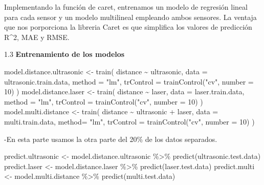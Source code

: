 \documentclass[
]{article}
\newenvironment{Shaded}{\begin{snugshade}}{\end{snugshade}}
\newcommand{\AttributeTok}[1]{\textcolor[rgb]{0.77,0.63,0.00}{#1}}
\newcommand{\DecValTok}[1]{\textcolor[rgb]{0.00,0.00,0.81}{#1}}
\newcommand{\FunctionTok}[1]{\textcolor[rgb]{0.00,0.00,0.00}{#1}}
\newcommand{\NormalTok}[1]{#1}
\newcommand{\OtherTok}[1]{\textcolor[rgb]{0.56,0.35,0.01}{#1}}
\newcommand{\SpecialCharTok}[1]{\textcolor[rgb]{0.00,0.00,0.00}{#1}}
\newcommand{\StringTok}[1]{\textcolor[rgb]{0.31,0.60,0.02}{#1}}
\begin{document}
Implementando la función de caret, entrenamos un modelo de regresión
lineal para cada sensor y un modelo multilineal empleando ambos
sensores. La ventaja que nos porporciona la libreria Caret es que
simplifica los valores de predicción R\^{}2, MAE y RMSE.

1.3 \textbf{Entrenamiento de los modelos}

\begin{Shaded}
\begin{Highlighting}[]
\NormalTok{model.distance.ultrasonic }\OtherTok{\textless{}{-}} \FunctionTok{train}\NormalTok{(}
\NormalTok{        distance }\SpecialCharTok{\textasciitilde{}}\NormalTok{ ultrasonic,}
        \AttributeTok{data =}\NormalTok{ ultrasonic.train.data,}
        \AttributeTok{method =} \StringTok{"lm"}\NormalTok{,}
        \AttributeTok{trControl =} \FunctionTok{trainControl}\NormalTok{(}\StringTok{"cv"}\NormalTok{, }\AttributeTok{number =} \DecValTok{10}\NormalTok{)}
\NormalTok{        )}
\NormalTok{model.distance.laser }\OtherTok{\textless{}{-}} \FunctionTok{train}\NormalTok{(}
\NormalTok{        distance }\SpecialCharTok{\textasciitilde{}}\NormalTok{ laser,}
        \AttributeTok{data =}\NormalTok{ laser.train.data,}
        \AttributeTok{method =} \StringTok{"lm"}\NormalTok{,}
        \AttributeTok{trControl =} \FunctionTok{trainControl}\NormalTok{(}\StringTok{"cv"}\NormalTok{, }\AttributeTok{number =} \DecValTok{10}\NormalTok{)}
\NormalTok{    )}
\NormalTok{model.multi.distance }\OtherTok{\textless{}{-}} \FunctionTok{train}\NormalTok{(}
\NormalTok{        distance }\SpecialCharTok{\textasciitilde{}}\NormalTok{ ultrasonic }\SpecialCharTok{+}\NormalTok{ laser,}
        \AttributeTok{data =}\NormalTok{ multi.train.data,}
        \AttributeTok{method=} \StringTok{"lm"}\NormalTok{,}
        \AttributeTok{trControl =} \FunctionTok{trainControl}\NormalTok{(}\StringTok{"cv"}\NormalTok{, }\AttributeTok{number =} \DecValTok{10}\NormalTok{)}
\NormalTok{    )}
\end{Highlighting}
\end{Shaded}

-En esta parte usamos la otra parte del 20\% de los datos separados.

\begin{Shaded}
\begin{Highlighting}[]
\NormalTok{predict.ultrasonic }\OtherTok{\textless{}{-}}\NormalTok{ model.distance.ultrasonic }\SpecialCharTok{\%\textgreater{}\%}  \FunctionTok{predict}\NormalTok{(ultrasonic.test.data)}
\NormalTok{predict.laser }\OtherTok{\textless{}{-}}\NormalTok{ model.distance.laser }\SpecialCharTok{\%\textgreater{}\%} \FunctionTok{predict}\NormalTok{(laser.test.data)}
\NormalTok{predict.multi }\OtherTok{\textless{}{-}}\NormalTok{ model.multi.distance }\SpecialCharTok{\%\textgreater{}\%} \FunctionTok{predict}\NormalTok{(multi.test.data)}
\end{Highlighting}
\end{Shaded}
\end{document}
